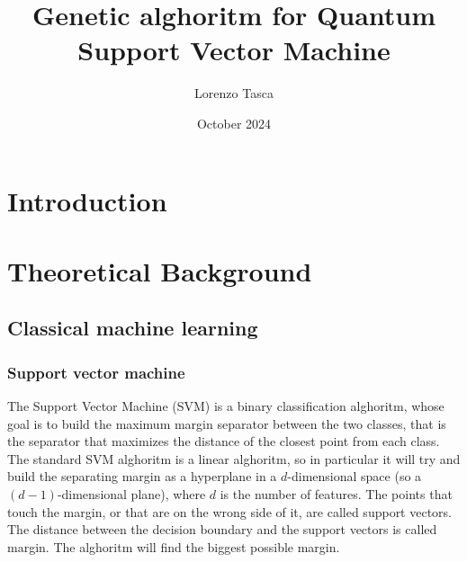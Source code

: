 \documentclass[a4paper]{article}
\title{Genetic alghoritm for Quantum Support Vector Machine}
\author{Lorenzo Tasca}
\date{October 2024}
\begin{document}
\maketitle
\tableofcontents

\newpage


\section{Introduction}


\section{Theoretical Background}

\subsection{Classical machine learning}

\subsubsection{Support vector machine}



The Support Vector Machine (SVM) is a binary classification alghoritm, whose goal is to build the maximum margin separator between the two classes, that is the separator that maximizes the distance of the closest point from each class. The standard SVM alghoritm is a linear alghoritm, so in particular it will try and build the separating margin as a hyperplane in a $d$-dimensional space (so a $(d-1)$-dimensional plane), where $d$ is the number of features. The points that touch the margin, or that are on the wrong side of it, are called support vectors. The distance between the decision boundary and the support vectors is called margin. The alghoritm will find the biggest possible margin. 
\end{document}
